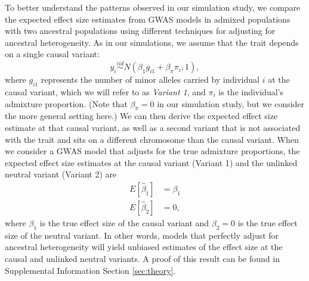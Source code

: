 \documentclass[12pt]{article}
\begin{document}
To better understand the patterns observed in our simulation study, we compare the expected effect size estimates from GWAS models in admixed populations with two ancestral populations using different techniques for adjusting for ancestral heterogeneity.
As in our simulations, we assume that the trait depends on a single causal variant: $$y_i \stackrel{iid}{\sim} N(\beta_1 g_{i1} + \beta_\pi \pi_i, 1),$$ where $g_{i1}$ represents the number of minor alleles carried by individual $i$ at the causal variant, which we will refer to as \textit{Variant 1}, and $\pi_i$ is the individual's admixture proportion.
(Note that $\beta_\pi = 0$ in our simulation study, but we consider the more general setting here.)
We can then derive the expected effect size estimate at that causal variant, as well as a second variant that is not associated with the trait and sits on a different chromosome than the causal variant.
When we consider a GWAS model that adjusts for the true admixture proportions,
the expected effect size estimates at the causal variant (Variant 1) and the unlinked neutral variant (Variant 2) are
\begin{equation}
\begin{aligned}
E[\hat\beta_1] &= \beta_1 \\
E[\hat\beta_2] &= 0,
\end{aligned}
\label{eqn:pi}
\end{equation}
where $\beta_1$ is the true effect size of the causal variant and $\beta_2 = 0$ is the true effect size of the neutral variant.
In other words, models that perfectly adjust for ancestral heterogeneity will yield unbiased estimates of the effect size at the causal and unlinked neutral variants.
A proof of this result can be found in Supplemental Information Section \ref{sec:theory}.
\end{document}

